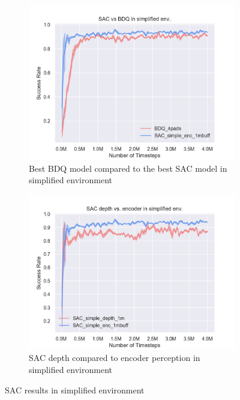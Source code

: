 \begin{figure}[!htbp]
    \begin{subfigure}{0.49\textwidth}
        \includegraphics[width=\linewidth]{figures/SAC_vs_BDQ_in_simplified_env}
        \caption{Best BDQ model compared to the best SAC model in simplified environment} \label{fig:sacvsbdq}
    \end{subfigure}%
    \hspace*{\fill}   %
    \begin{subfigure}{0.49\textwidth}
        \includegraphics[width=\linewidth]{figures/SAC_depth_vs_encoder_in_simplified_env}
        \caption{SAC depth compared to encoder perception in simplified environment}
    \end{subfigure}%
    \hspace*{\fill}   %


\caption{ SAC results in simplified environment\label{fig:scenes}}
\end{figure}

